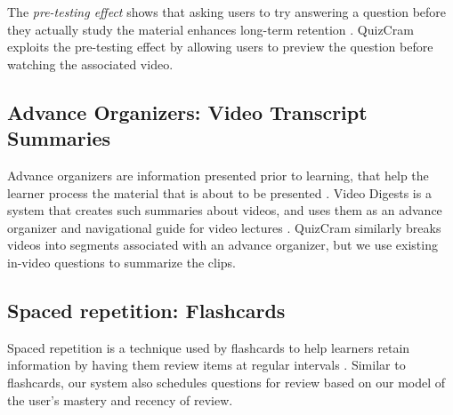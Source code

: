 \documentclass{chi-ext}
\begin{document}
The \emph{pre-testing effect} shows that asking users to try answering a question before they actually study the material enhances long-term retention \cite{pretesting}. QuizCram exploits the pre-testing effect by allowing users to preview the question before watching the associated video.

\subsection{Advance Organizers: Video Transcript Summaries}

Advance organizers are information presented prior to learning, that help the learner process the material that is about to be presented  \cite{advanceorganizers}. Video Digests is a system that creates such summaries about videos, and uses them as an advance organizer and navigational guide for video lectures \cite{videodigests}. QuizCram similarly breaks videos into segments associated with an advance organizer, but we use existing in-video questions to summarize the clips.


\subsection{Spaced repetition: Flashcards}


Spaced repetition is a technique used by flashcards to help learners retain information by having them review items at regular intervals \cite{karpicke2011spaced}. Similar to flashcards, our system also schedules questions for review based on our model of the user's mastery and recency of review. %
\end{document}
